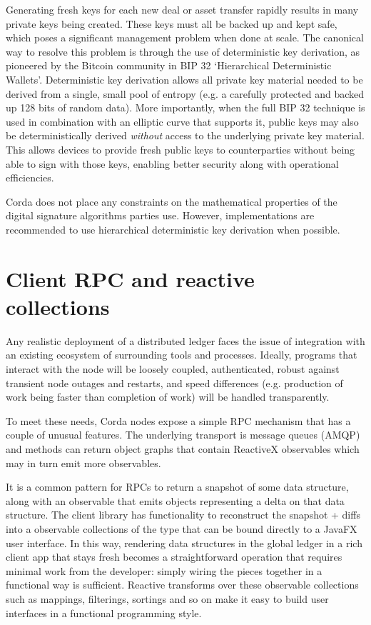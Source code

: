 \documentclass{article}
\begin{document}
Generating fresh keys for each new deal or asset transfer rapidly results in many private keys being created. These
keys must all be backed up and kept safe, which poses a significant management problem when done at scale. The
canonical way to resolve this problem is through the use of deterministic key derivation, as pioneered by the
Bitcoin community in BIP 32 `Hierarchical Deterministic Wallets'\cite{BIP32}. Deterministic key derivation allows
all private key material needed to be derived from a single, small pool of entropy (e.g. a carefully protected and
backed up 128 bits of random data). More importantly, when the full BIP 32 technique is used in combination with an
elliptic curve that supports it, public keys may also be deterministically derived \emph{without} access to the
underlying private key material. This allows devices to provide fresh public keys to counterparties without being
able to sign with those keys, enabling better security along with operational efficiencies.

Corda does not place any constraints on the mathematical properties of the digital signature algorithms parties
use. However, implementations are recommended to use hierarchical deterministic key derivation when possible.

\section{Client RPC and reactive collections}

Any realistic deployment of a distributed ledger faces the issue of integration with an existing ecosystem of
surrounding tools and processes. Ideally, programs that interact with the node will be loosely coupled,
authenticated, robust against transient node outages and restarts, and speed differences (e.g. production of work
being faster than completion of work) will be handled transparently.

To meet these needs, Corda nodes expose a simple RPC mechanism that has a couple of unusual features. The
underlying transport is message queues (AMQP) and methods can return object graphs that contain ReactiveX
observables\cite{Rx} which may in turn emit more observables.

It is a common pattern for RPCs to return a snapshot of some data structure, along with an observable that emits
objects representing a delta on that data structure. The client library has functionality to reconstruct the
snapshot + diffs into a observable collections of the type that can be bound directly to a JavaFX user interface.
In this way, rendering data structures in the global ledger in a rich client app that stays fresh becomes a
straightforward operation that requires minimal work from the developer: simply wiring the pieces together in a
functional way is sufficient. Reactive transforms over these observable collections such as mappings, filterings,
sortings and so on make it easy to build user interfaces in a functional programming style.
\end{document}
